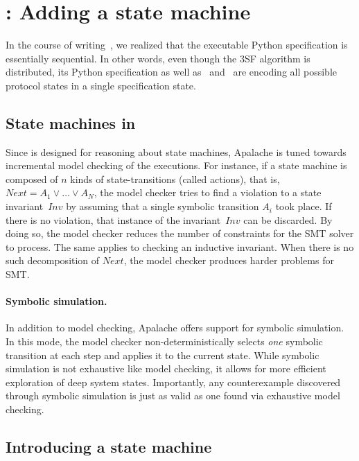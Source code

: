 
\section{\SpecThree{}: Adding a state machine}\label{sec:spec3}

In the course of writing~\SpecTwo{}, we realized
that the executable Python specification is essentially sequential. In other
words, even though the 3SF algorithm is distributed, its Python
specification as well as~\SpecOne{} and~\SpecTwo{} are encoding
all possible protocol states in a single specification state.

\subsection{State machines in \tlap{}}

Since \tlap{} is designed for reasoning about state machines, Apalache is tuned
towards incremental model checking of the executions. For instance, if a state
machine is composed of $n$ kinds of state-transitions (called actions), that
is, $\mathit{Next} = A_1 \vee \dots \vee A_N$, the model checker tries to find
a violation to a state invariant~$\textit{Inv}$ by assuming that a single
symbolic transition $A_i$ took place. If there is no violation, that instance
of the invariant~$\textit{Inv}$ can be discarded. By doing so, the model
checker reduces the number of constraints for the SMT solver to process.  The
same applies to checking an inductive invariant. When there is no such
decomposition of $\mathit{Next}$, the model checker produces harder problems
for SMT\@.

\paragraph{Symbolic simulation.} In addition to model checking, Apalache offers
support for symbolic simulation. In this mode, the model checker
non-deterministically selects \emph{one} symbolic transition at each step and
applies it to the current state. While symbolic simulation is not exhaustive
like model checking, it allows for more efficient exploration of deep system
states. Importantly, any counterexample discovered through symbolic simulation
is just as valid as one found via exhaustive model checking.

\subsection{Introducing a state machine}

